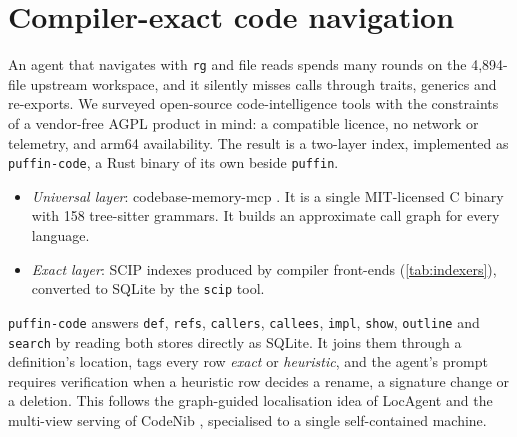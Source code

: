 \documentclass[11pt]{article}
\newcommand{\code}[1]{\texttt{#1}}
\begin{document}
\section{Compiler-exact code navigation}
\label{sec:index}

An agent that navigates with \code{rg} and file reads spends many rounds on the 4{,}894-file
upstream workspace, and it silently misses calls through traits, generics and re-exports. We
surveyed open-source code-intelligence tools with the constraints of a vendor-free AGPL product in
mind: a compatible licence, no network or telemetry, and arm64 availability. The result is a
two-layer index, implemented as \code{puffin-code}, a Rust binary of its own beside \code{puffin}.
\begin{itemize}
  \item \emph{Universal layer}: codebase-memory-mcp \cite{codebasememorymcp,vogel2026codebasememory}.
    It is a single MIT-licensed C binary with 158 tree-sitter \cite{treesitter} grammars. It builds
    an approximate call graph for every language.
  \item \emph{Exact layer}: SCIP \cite{scip} indexes produced by compiler front-ends
    (\cref{tab:indexers}), converted to SQLite by the \code{scip} tool.
\end{itemize}
\code{puffin-code} answers \code{def}, \code{refs}, \code{callers}, \code{callees}, \code{impl},
\code{show}, \code{outline} and \code{search} by reading both stores directly as SQLite. It joins
them through a definition's location, tags every row \emph{exact} or \emph{heuristic}, and the
agent's prompt requires verification when a heuristic row decides a rename, a signature change
or a deletion. This follows the graph-guided localisation idea of LocAgent
\cite{chen2025locagent} and the multi-view serving of CodeNib \cite{yu2026codenib}, specialised to
a single self-contained machine.
\end{document}
